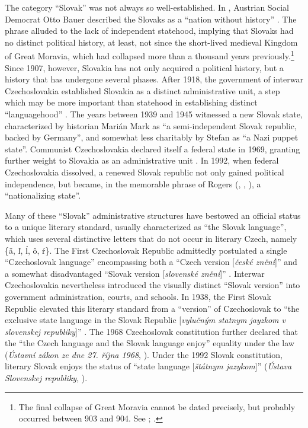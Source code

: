 The category “Slovak” was not always so well-established. In \citeyear{bauer_nationalitatenfrage_1907}, Austrian Social Democrat Otto Bauer described the Slovaks as a “nation without history” \citep[188]{bauer_nationalitatenfrage_1907}. The phrase alluded to the lack of independent statehood, implying that Slovaks had no distinct political history, at least, not since the short-lived medieval Kingdom of Great Moravia, which had collapsed more than a thousand years previously.\footnote{The final collapse of Great Moravia cannot be dated precisely, but probably occurred between 903 and 904. See \citet[69]{spinei_great_2003}; \citet[69]{kouril_magyars_2019}.} Since 1907, however, Slovakia has not only acquired a political history, but a history that has undergone several phases. After 1918, the government of interwar Czechoslovakia established Slovakia as a distinct administrative unit, a step which may be more important than statehood in establishing distinct “languagehood” \citep[40]{maxwell_taxonomies_2015}. The years between 1939 and 1945 witnessed a new Slovak state, characterized by historian Marián Mark \citet[xxiii]{stolarik_introduction_2010} as “a semi-independent Slovak republic, backed by Germany”, and somewhat less charitably by Stefan \citet[131]{auer_liberal_2004} as “a Nazi puppet state”. Communist Czechoslovakia declared itself a federal state in 1969, granting further weight to Slovakia as an administrative unit \citep[444--467]{kirschbaum_federalism_1977}. In 1992, when federal Czechoslovakia dissolved, a renewed Slovak republic not only gained political independence, but became, in the memorable phrase of Rogers \citeauthor{brubaker_national_1995} (\citeyear[107--132]{brubaker_national_1995}, \citeyear[411--437]{brubaker_nationalizing_1996}, \citeyear[1785--1814]{brubaker_nationalizing_2011}), a “nationalizing state”.

Many of these “Slovak” administrative structures have bestowed an official status to a unique literary standard, usually characterized as “the Slovak language”, which uses several distinctive letters that do not occur in literary Czech, namely \{ä, ľ, ĺ, ô, ŕ\}. The First Czechoslovak Republic admittedly postulated a single “Czechoslovak language” encompassing both a “Czech version [\textit{české znění}]” and a somewhat disadvantaged “Slovak version [\textit{slovenské znění}]” \citep[20--22]{horacek_jazykove_1928}. Interwar Czechoslovakia nevertheless introduced the visually distinct “Slovak version” into government administration, courts, and schools. In 1938, the First Slovak Republic elevated this literary standard from a “version” of Cze\-choslovak to “the exclusive state language in the Slovak Republic [\textit{vylučným statnym jayzkom v slovenskej republiky}]” \citep[209--210]{janosik_na_1938}. The 1968 Czechoslovak constitution further declared that the “the Czech language and the Slovak language enjoy” equality under the law (\textit{Ústavní zákon ze dne 27. října 1968}, \citeyear[§6(1), 382]{noauthor_ustava_1968}). Under the 1992 Slovak constitution, literary Slovak enjoys the status of “state language [\textit{štátnym jazykom}]” (\textit{Ústava Slovenskej republiky}, \citeyear[§6(1)]{noauthor_ustava_1992}).

